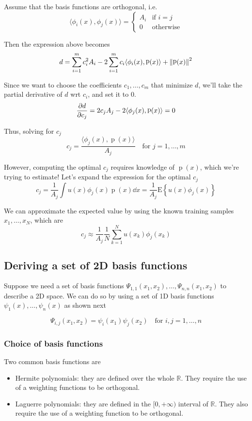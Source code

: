 \documentclass[oneside,onecolumn]{report}
\newcommand{\E}[1]{\text{E} \left\{ #1 \right\}}
\DeclareMathOperator*{\pdf}{p}
\begin{document}
Assume that the basis functions are orthogonal, i.e.
$$ \langle \phi_i(x), \phi_j(x) \rangle = \begin{cases}
    A_i & \text{if } i = j \\
    0   & \text{otherwise}
\end{cases} $$

Then the expression above becomes
$$ d = \sum_{i = 1}^m c_i^2 A_i - 2 \sum_{i = 1}^m c_i \langle \phi_i(x), \pdf(x) \rangle + \norm{\pdf(x)}^2 $$

Since we want to choose the coefficients $c_1, \dots, c_m$ that minimize $d$, we'll take the partial derivative of $d$ wrt $c_i$, and set it to 0.
$$ \pdv{d}{c_j} = 2 c_j A_j - 2 \langle \phi_j(x), \pdf(x) \rangle = 0 $$

Thus, solving for $c_j$
$$ c_j = \frac{\langle \phi_j(x), \pdf(x) \rangle}{A_j} \quad \text{for } j = 1, \dots, m $$

However, computing the optimal $c_j$ requires knowledge of $\pdf(x)$, which we're trying to estimate!
Let's expand the expression for the optimal $c_j$
$$ c_j
= \frac{1}{A_j} \int u(x) \phi_j(x) \pdf(x) \dd x
= \frac{1}{A_j} \E{u(x) \phi_j(x)} $$

We can approximate the expected value by using the known training samples $x_1, \dots, x_N$, which are
$$ c_j
\approx \frac{1}{A_j} \frac{1}{N} \sum_{k = 1}^N u(x_k) \phi_j(x_k) $$

\subsection{Deriving a set of 2D basis functions}
Suppose we need a set of basis functions $\Psi_{1, 1}(x_1, x_2), \dots, \Psi_{n, n}(x_1, x_2)$ to describe a 2D space.
We can do so by using a set of 1D basis functions $\psi_1(x), \dots, \psi_n(x)$ as shown next

$$ \Psi_{i, j}(x_1, x_2) = \psi_i(x_1) \psi_j(x_2) \quad \text{for } i, j = 1, \dots, n $$

\subsubsection{Choice of basis functions}
Two common basis functions are
\begin{itemize}
    \item Hermite polynomials: they are defined over the whole $\mathbb R$.
    They require the use of a weighting functions to be orthogonal.

    \item Laguerre polynomials: they are defined in the $[0, +\infty)$ interval of $\mathbb R$.
    They also require the use of a weighting function to be orthogonal.
\end{itemize}
\end{document}
